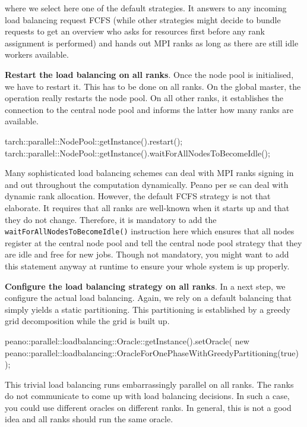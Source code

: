 \noindent
where we select here one of the default strategies. 
It answers to any incoming load balancing request FCFS (while other strategies
might decide to bundle requests to get an overview who asks for resources first
before any rank assignment is performed) and hands out MPI ranks as long as
there are still idle workers available.

{\bf Restart the load balancing on all ranks}.
Once the node pool
is initialised, we have to restart it.
This has to be done on all ranks. 
On the global master, the operation really restarts the node pool.
On all other ranks, it establishes the connection to the central node pool
and informs the latter how many ranks are available.

\begin{code}
tarch::parallel::NodePool::getInstance().restart();
tarch::parallel::NodePool::getInstance().waitForAllNodesToBecomeIdle();
\end{code}

\begin{remark}
Many sophisticated load balancing schemes can deal with MPI ranks signing in and
out throughout the computation dynamically.
Peano per se can deal with dynamic rank allocation.  
However, the default FCFS strategy is not that elaborate. 
It requires that all ranks are well-known when it starts up and that they do not
change.
Therefore, it is mandatory to add the \texttt{waitForAllNodesToBecomeIdle()}
instruction here which ensures that all nodes register at the central node pool
and tell the central node pool strategy that they are idle and free for new
jobs. 
Though not mandatory, you might want to add this statement anyway at runtime to
ensure your whole system is up properly.
\end{remark}

\noindent
{\bf Configure the load balancing strategy on all ranks}.
In a next step, we configure the
actual load balancing.
Again, we rely on a default balancing that simply yields a static partitioning. 
This partitioning is established by a greedy grid decomposition while the grid
is built up.

\begin{code}
peano::parallel::loadbalancing::Oracle::getInstance().setOracle(
 new peano::parallel::loadbalancing::OracleForOnePhaseWithGreedyPartitioning(true)
);
\end{code}

\noindent
This trivial load balancing runs embarrassingly parallel on all ranks. 
The ranks do not communicate to come up with load balancing decisions.
In such a case, you could use different oracles on different ranks. 
In general, this is not a good idea and all ranks should run the same oracle.
 
